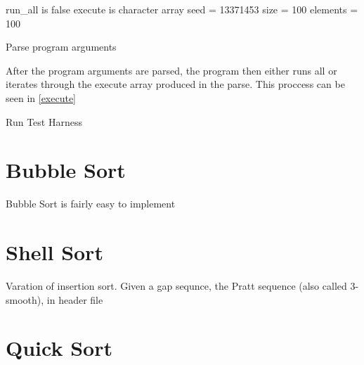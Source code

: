 \documentclass[12pt]{article}
\begin{document}
    \begin{algorithm}
        run\_all is false\;
        execute is character array\;
        seed = 13371453
        size = 100
        elements = 100
        \caption{Parse program arguments}\label{parse}
    \end{algorithm}

    After the program arguments are parsed, the program then either runs all or iterates through the execute array produced in the parse. This proccess can be seen in \vref{execute}

    \begin{algorithm}
        \caption{Run Test Harness}\label{execute}
    \end{algorithm}

    \section{Bubble Sort}

    Bubble Sort is fairly easy to implement

    \section{Shell Sort}

    Varation of insertion sort.
    Given a gap sequnce, the Pratt sequence (also called 3-smooth), in header file
    \section{Quick Sort}
\end{document}
